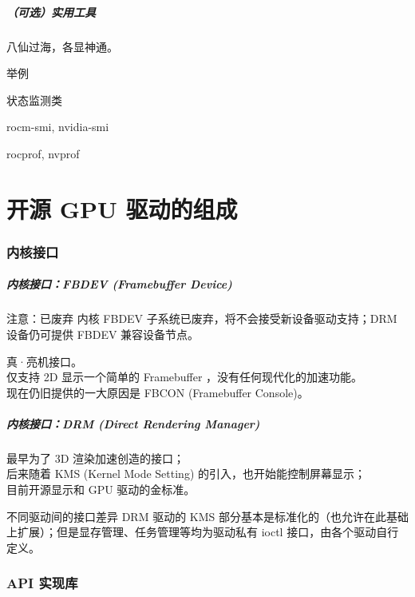 \documentclass{ctexbeamer}
\begin{document}
\begin{frame}
    \frametitle{（可选）实用工具}
    八仙过海，各显神通。
    \begin{block}{举例}
        \begin{labeling}{状态监测类}
            \item [状态监测类] rocm-smi, nvidia-smi
            \item [性能分析类] rocprof, nvprof
        \end{labeling}
    \end{block}
\end{frame}

\part{开源 GPU 驱动的组成}
\frame{\partpage}

\section{内核接口}

\begin{frame}
    \frametitle{内核接口：FBDEV (Framebuffer Device)}
    \begin{alertblock}{注意：已废弃}
        内核 FBDEV 子系统已废弃，将不会接受新设备驱动支持；DRM 设备仍可提供 FBDEV 兼容设备节点。
    \end{alertblock}
    真·亮机接口。\\
    仅支持 2D 显示一个简单的 Framebuffer ，没有任何现代化的加速功能。\\
    现在仍旧提供的一大原因是 FBCON (Framebuffer Console)。
\end{frame}

\begin{frame}
    \frametitle{内核接口：DRM (Direct Rendering Manager)}
    最早为了 3D 渲染加速创造的接口；\\
    后来随着 KMS (Kernel Mode Setting) 的引入，也开始能控制屏幕显示；\\
    目前开源显示和 GPU 驱动的金标准。\\
    \begin{block}{不同驱动间的接口差异}
        DRM 驱动的 KMS 部分基本是标准化的（也允许在此基础上扩展）；但是显存管理、任务管理等均为驱动私有 ioctl 接口，由各个驱动自行定义。
    \end{block}
\end{frame}

\section{API 实现库}
\end{document}
